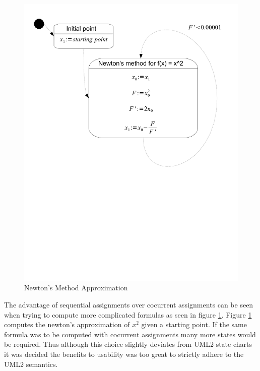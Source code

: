 \begin{figure}[htp]
    \centering
    \includegraphics[trim= 10mm 110mm 10mm 10mm, clip, width=\imgmedium]{./images/state_uml2_newtons.pdf}
    \caption{Newton's Method Approximation}
    \label{fig:state_uml2_newtons}
\end{figure}

The advantage of sequential assignments over cocurrent assignments can be seen when trying to compute more complicated formulas as seen in figure \ref{fig:state_uml2_newtons}. Figure \ref{fig:state_uml2_newtons} computes the newton's approximation of $x^2$ given a starting point. If the same formula was to be computed with cocurrent assignments many more states would be required. Thus although this choice slightly deviates from UML2 state charts it was decided the benefits to usability was too great to strictly adhere to the UML2 semantics.